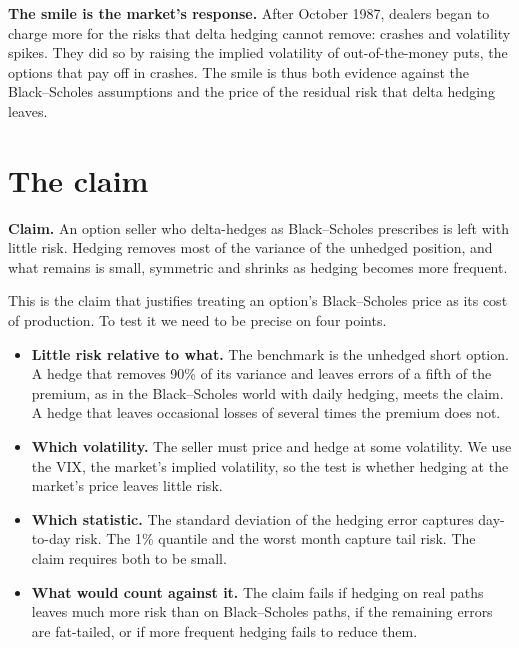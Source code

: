 \textbf{The smile is the market's response.} After October 1987, dealers began to charge more for the risks that delta hedging cannot remove: crashes and volatility spikes. They did so by raising the implied volatility of out-of-the-money puts, the options that pay off in crashes. The smile is thus both evidence against the Black--Scholes assumptions and the price of the residual risk that delta hedging leaves.

\section{The claim}
\label{sec:15-claim}

\begin{callout}
\textbf{Claim.} An option seller who delta-hedges as Black--Scholes prescribes is left with little risk. Hedging removes most of the variance of the unhedged position, and what remains is small, symmetric and shrinks as hedging becomes more frequent.
\end{callout}

This is the claim that justifies treating an option's Black--Scholes price as its cost of production. To test it we need to be precise on four points.

\begin{itemize}
  \item \textbf{Little risk relative to what.} The benchmark is the unhedged short option. A hedge that removes 90\% of its variance and leaves errors of a fifth of the premium, as in the Black--Scholes world with daily hedging, meets the claim. A hedge that leaves occasional losses of several times the premium does not.
  \item \textbf{Which volatility.} The seller must price and hedge at some volatility. We use the VIX, the market's implied volatility, so the test is whether hedging at the market's price leaves little risk.
  \item \textbf{Which statistic.} The standard deviation of the hedging error captures day-to-day risk. The 1\% quantile and the worst month capture tail risk. The claim requires both to be small.
  \item \textbf{What would count against it.} The claim fails if hedging on real paths leaves much more risk than on Black--Scholes paths, if the remaining errors are fat-tailed, or if more frequent hedging fails to reduce them.
\end{itemize}

